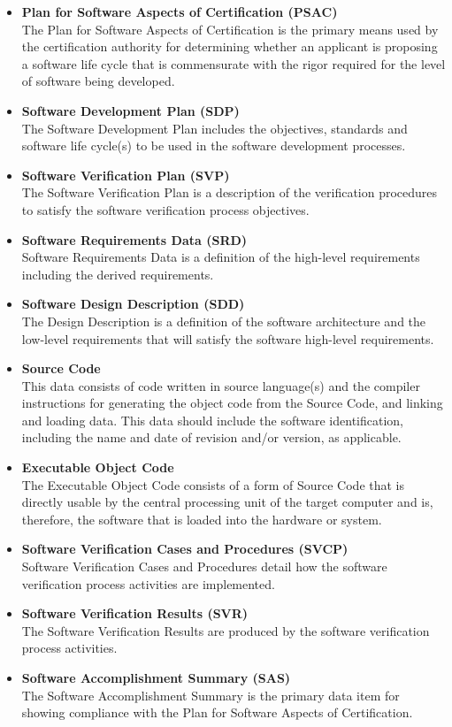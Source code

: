 \documentclass[a4paper]{article}
\begin{document}
\begin{itemize}
	\item \textbf{Plan for Software Aspects of Certification (PSAC)}\\
		The Plan for Software Aspects of Certification is the primary means used by the certification authority for determining whether an applicant is proposing a software life cycle that is commensurate with the rigor required for the level of software being developed.
	\item \textbf{Software Development Plan (SDP)}\\
		The Software Development Plan includes the objectives, standards and software life cycle(s) to be used in the software development processes.
	\item \textbf{Software Verification Plan (SVP)}\\
		The Software Verification Plan is a description of the verification procedures to satisfy the software verification process objectives.
	\item \textbf{Software Requirements Data (SRD)}\\
		Software Requirements Data is a definition of the high-level requirements including the derived requirements.
	\item \textbf{Software Design Description (SDD)}\\
		The Design Description is a definition of the software architecture and the low-level requirements that will satisfy the software high-level requirements.
	\item \textbf{Source Code}\\
		This data consists of code written in source language(s) and the compiler instructions for generating the object code from the Source Code, and linking and loading data. This data should include the software identification, including the name and date of revision and/or version, as applicable.
	\item \textbf{Executable Object Code}\\
		The Executable Object Code consists of a form of Source Code that is directly usable by the central processing unit of the target computer and is, therefore, the software that is loaded into the hardware or system.
	\item \textbf{Software Verification Cases and Procedures (SVCP)}\\
		Software Verification Cases and Procedures detail how the software verification process activities are implemented.
	\item \textbf{Software Verification Results (SVR)}\\
		The Software Verification Results are produced by the software verification process activities.
	\item \textbf{Software Accomplishment Summary (SAS)}\\
		The Software Accomplishment Summary is the primary data item for showing compliance with the Plan for Software Aspects of Certification.
\end{itemize}
\end{document}

